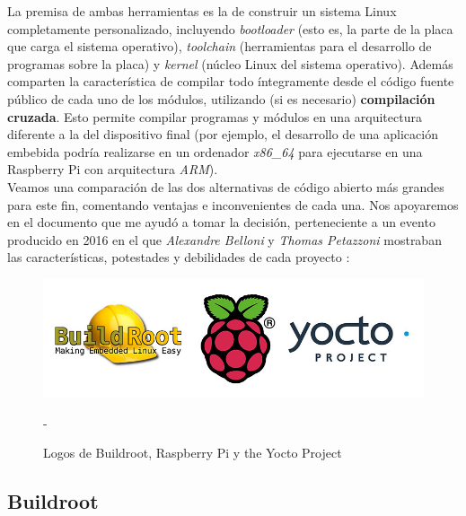 La premisa de ambas herramientas es la de construir un sistema Linux completamente personalizado, incluyendo \textit{bootloader} (esto es, la parte de la placa que carga el sistema operativo), \textit{toolchain} (herramientas para el desarrollo de programas sobre la placa) y \textit{kernel} (núcleo Linux del sistema operativo). Además comparten la característica de compilar todo íntegramente desde el código fuente público de cada uno de los módulos, utilizando (si es necesario) \textbf{compilación cruzada}. Esto permite compilar programas y módulos en una arquitectura diferente a la del dispositivo final (por ejemplo, el desarrollo de una aplicación embebida podría realizarse en un ordenador \textit{x86\_64} para ejecutarse en una Raspberry Pi con arquitectura \textit{ARM}).\\

Veamos una comparación de las dos alternativas de código abierto más grandes para este fin, comentando ventajas e inconvenientes de cada una. Nos apoyaremos en el documento que me ayudó a tomar la decisión, perteneciente a un evento producido en 2016 en el que \textit{Alexandre Belloni} y \textit{Thomas Petazzoni} mostraban las características, potestades y debilidades de cada proyecto \cite{yocto-vs-buildroot-event}:

\begin{figure}[H]
	\centering
	\includegraphics[width=0.6\linewidth]{imagenes/buildroot_rpi_yocto_logos.jpg}
	\caption{Logos de Buildroot, Raspberry Pi y the Yocto Project} - \cite{imagen-buildroot-rpi-yocto}
	\label{rpi-buildroot-vs-yocto}
\end{figure}

\subsection{Buildroot}

